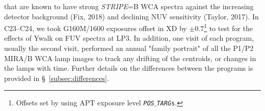 that are known to have strong \textit{STRIPE}=B WCA spectra against the increasing detector background (Fix, 2018) and declining NUV sensitivity (Taylor, 2017).
In C23--C24, we took G160M/1600 exposures offset in XD by $\pm 0.7$\arcsec\footnote{Offsets set by using APT exposure level \texttt{{\it POS$\_$TARG}s}.} to test for the effects of Ywalk on FUV spectra at LP3.
In addition, one visit of each program, usually the second visit, performed an annual "family portrait"  of all the P1/P2 MIRA/B WCA lamp images to track any drifting of the centroids, or changes in the lamps with time.
Further details on the differences between the programs is provided in \S~\ref{subsec:differences}.
